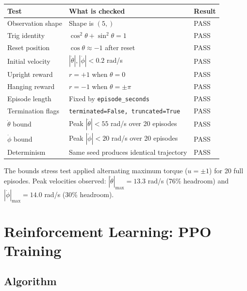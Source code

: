 \documentclass[12pt,a4paper]{article}
\begin{document}
\begin{center}
\begin{tabular}{lll}
\toprule
\textbf{Test} & \textbf{What is checked} & \textbf{Result} \\
\midrule
Observation shape     & Shape is $(5,)$                               & PASS \\
Trig identity         & $\cos^2\theta + \sin^2\theta = 1$             & PASS \\
Reset position        & $\cos\theta \approx -1$ after reset           & PASS \\
Initial velocity      & $|\dot\theta|, |\dot\phi| < 0.2$ rad/s        & PASS \\
Upright reward        & $r = +1$ when $\theta = 0$                    & PASS \\
Hanging reward        & $r = -1$ when $\theta = \pm\pi$               & PASS \\
Episode length        & Fixed by \texttt{episode\_seconds}             & PASS \\
Termination flags     & \texttt{terminated=False, truncated=True}     & PASS \\
$\dot\theta$ bound    & Peak $|\dot\theta| < 55$ rad/s over 20 episodes & PASS \\
$\dot\phi$ bound      & Peak $|\dot\phi| < 20$ rad/s over 20 episodes  & PASS \\
Determinism           & Same seed produces identical trajectory        & PASS \\
\bottomrule
\end{tabular}
\end{center}

\noindent The bounds stress test applied alternating maximum torque ($u = \pm 1$) for
20 full episodes. Peak velocities observed: $|\dot\theta|_{\max} = 13.3$ rad/s
(76\% headroom) and $|\dot\phi|_{\max} = 14.0$ rad/s (30\% headroom).

\section{Reinforcement Learning: PPO Training}

\subsection{Algorithm}
\end{document}
